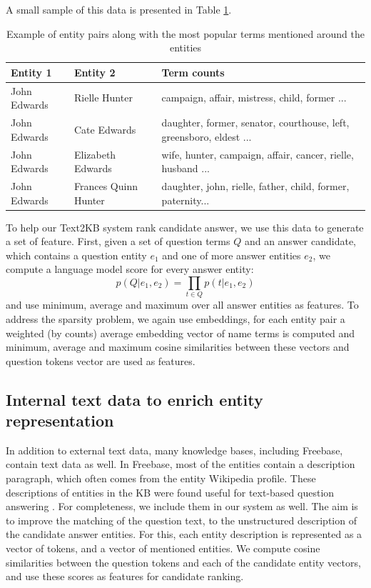 A small sample of this data is presented in Table \ref{table:clueweb_entitypairs_langmodel}.

\begin{table}
\caption{Example of entity pairs along with the most popular terms mentioned around the entities}
\label{table:clueweb_entitypairs_langmodel}
\begin{tabular}{| p{1.25cm} | p{1.23cm} | p{4.5cm} |}
\hline
Entity 1 & Entity 2 & Term counts\\
\hline
John Edwards & Rielle Hunter & campaign, affair, mistress, child, former ...\\
\hline
John Edwards & Cate Edwards & daughter, former, senator, courthouse, left, greensboro, eldest ...\\
\hline
John Edwards & Elizabeth Edwards & wife, hunter, campaign, affair, cancer, rielle, husband ...\\
\hline
John Edwards & Frances Quinn Hunter & daughter, john, rielle, father, child, former, paternity...\\
\hline
\end{tabular}
\end{table}

To help our Text2KB system rank candidate answer, we use this data to generate a set of feature.
First, given a set of question terms $Q$ and an answer candidate, which contains a question entity $e_1$ and one of more answer entities $e_2$, we compute a language model score for every answer entity:
$$p(Q|e_1, e_2) = \prod_{t\in Q} p(t | e_1, e_2)$$
and use minimum, average and maximum over all answer entities as features.
To address the sparsity problem, we again use embeddings, 
\ie for each entity pair a weighted (by counts) average embedding vector of name terms is computed and minimum, average and maximum cosine similarities between these vectors and question tokens vector are used as features.

\subsection{Internal text data to enrich entity representation}
In addition to external text data, many knowledge bases, including Freebase, contain text data as well.
In Freebase, most of the entities contain a description paragraph, which often comes from the entity Wikipedia profile.
These descriptions of entities in the KB were found useful for text-based question answering \cite{Sun:2015:ODQ:2736277.2741651}.
For completeness, we include them in our system as well.
The aim is to improve the matching of the question text, to the unstructured description of the candidate answer entities.
For this, each entity description is represented as a vector of tokens, and a vector of mentioned entities.
We compute cosine similarities between the question tokens and each of the candidate entity vectors, and use these scores as features for candidate ranking.
